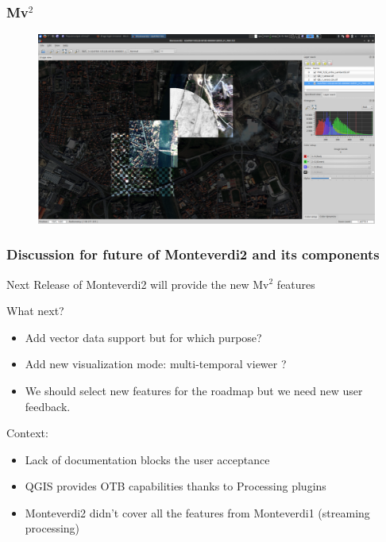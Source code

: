 \documentclass[8pt]{beamer}
\begin{document}

\begin{frame}
\frametitle{Mv$^{2}$}
\begin{figure}[hbtp]
    \centering
    \includegraphics[scale=0.17]{images/2015-06-01_Shader-edition.png} 
\end{figure}
\end{frame}


\begin{frame}
\frametitle{Discussion for future of Monteverdi2 and its components}
Next Release of Monteverdi2 will provide the new Mv$^{2}$ features

What next?
\begin{itemize}
 \item Add vector data support but for which purpose?
 \item Add new visualization mode: multi-temporal viewer ?
 \item We should select new features for the roadmap but we need new user feedback. 
\end{itemize}

Context: 
\begin{itemize}
 \item Lack of documentation blocks the user acceptance
 \item QGIS provides OTB capabilities thanks to Processing plugins 
 \item Monteverdi2 didn't cover all the features from Monteverdi1 (streaming processing)
\end{itemize}
\end{frame}
\end{document}
